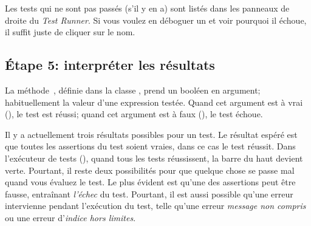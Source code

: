 \documentclass[a4paper,10pt,twoside]{book}
\begin{document}


Les tests qui ne sont pas passés (s'il y en a) sont listés dans les panneaux de droite du \emph{Test Runner}.
Si vous voulez en déboguer un et voir pourquoi il échoue, il suffit juste de cliquer sur le nom. 

\subsection{\'Etape 5: interpréter les résultats}

La méthode \,, définie dans la classe
, prend un booléen en argument; habituellement la valeur
d'une expression testée. Quand cet argument est à vrai (), le
test est réussi; quand cet argument est à faux (), le test échoue.  

Il y a actuellement trois résultats possibles pour un test. Le
résultat espéré est que toutes les assertions du test soient vraies,
dans ce cas le test réussit. Dans l'exécuteur de tests
(), quand tous les tests réussissent, la barre du haut
devient verte. Pourtant, il reste deux possibilités pour que quelque
chose se passe mal quand vous évaluez le test. Le plus évident est
qu'une des assertions peut être fausse, entraînant \emph{l'échec} du
test. Pourtant, il est aussi possible qu'une erreur intervienne
pendant l'exécution du test, telle qu'une erreur \emph{message non
  compris} ou une erreur 
d'\emph{indice hors limites}.
\end{document}
